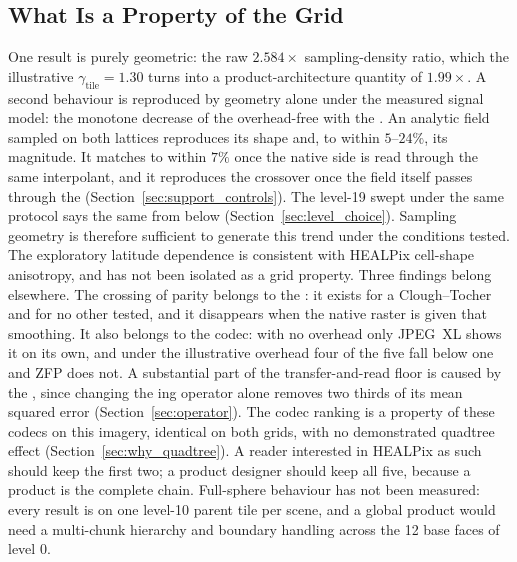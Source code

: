 \subsection{What Is a Property of the Grid}
\label{sec:grid_property}
One result is purely geometric: the raw $2.584\times$ sampling-density
ratio, which the illustrative $\gamma_{\mathrm{tile}}=1.30$ turns into a
product-architecture quantity of $1.99\times$. A second behaviour is
reproduced by geometry alone under the measured signal model: the
monotone decrease of the overhead-free  with the . An
analytic field sampled on both lattices reproduces its shape and, to
within $5$--$24\%$, its magnitude. It matches to within $7\%$ once the
native side is read through the same interpolant, and it reproduces the
crossover once the field itself passes through the 
(Section~\ref{sec:support_controls}). The level-19  swept under
the same protocol says the same from below
(Section~\ref{sec:level_choice}). Sampling geometry is therefore
sufficient to generate this trend under the conditions tested. The
exploratory latitude dependence is consistent with HEALPix cell-shape
anisotropy, and has not been isolated as a grid property. Three
findings belong elsewhere. The crossing of parity belongs to
the : it exists for a Clough--Tocher  and for no
other  tested, and it disappears when the native raster is
given that smoothing. It also belongs to the codec: with no overhead
only JPEG~XL shows it on its own, and under the illustrative overhead
four of the five fall below one and ZFP does not. A substantial part of the
transfer-and-read floor is caused by the , since changing the
ing operator alone removes two thirds of its mean squared error
(Section~\ref{sec:operator}). The codec ranking is a property of these
codecs on this imagery, identical on both grids, with no demonstrated
quadtree effect (Section~\ref{sec:why_quadtree}). A reader interested
in HEALPix as such should keep the first two; a product designer
should keep all five, because a product is the complete chain.
Full-sphere behaviour has not been measured: every result is on one
level-10 parent tile per scene, and a global product would need a
multi-chunk hierarchy and boundary handling across the 12 base faces of
level 0.

